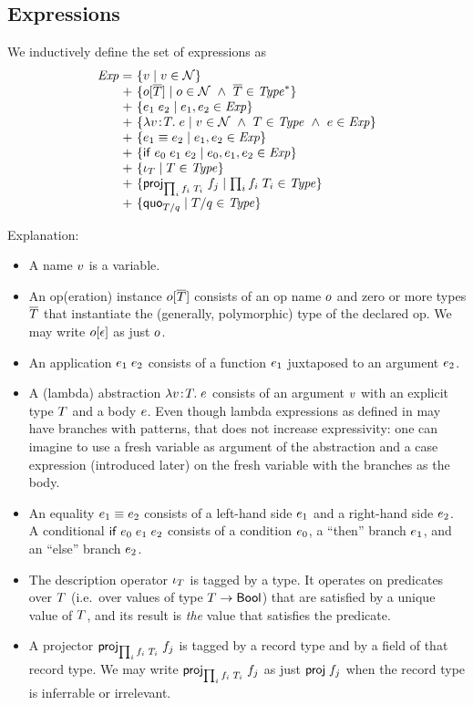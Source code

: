 \subsection{Expressions}

We inductively define the set of expressions as
\[
\setdefIXoI
 {\Expr}
 {+}
 {\setST{\var}{\var\in\Nam}}
 {\setST{\opO}{\onam\in\Nam\AND\typS\in\Seq{\Typ}}}
 {\setST{\appO}{\expr_1,\expr_2\in\Expr}}
 {\setST{\absO}{\var\in\Nam\AND\typ\in\Typ\AND\expr\in\Expr}}
 {\setST{\eqO}{\expr_1,\expr_2\in\Expr}}
 {\setST{\iifO}{\expr_0,\expr_1,\expr_2\in\Expr}}
 {\setST{\descopO}{\typ\in\Typ}}
\setdefIXoII
 {+}
 {\setST{\projopO}{\trecO\in\Typ}}
 {\setST{\quotO}{\tquotO\in\Typ}}
\]

Explanation:
\begin{itemize}
\item
A name $v$ is a variable.
\item
An op(eration) instance $o[\overline{T}]$ consists of an op name $o$ and zero or more
types $\overline{T}$ that instantiate the (generally, polymorphic) type of the
declared op. We may write $o[\epsilon]$ as just $o$.
\item
An application $e_1\;e_2$ consists of a function $e_1$ juxtaposed to an
argument $e_2$.
\item
A (lambda) abstraction $\lambda v\!:\!T.\;e$ consists of an argument $v$ with an explicit
type $T$ and a body $e$. Even though lambda expressions as defined in
\cite{lm} may have branches with patterns, that does not increase
expressivity: one can imagine to use a fresh variable as argument of the
abstraction and a case expression (introduced later) on the fresh variable
with the branches as the body.
\item
An equality $e_1\equiv e_2$ consists of a left-hand side $e_1$ and a right-hand
side $e_2$.
A conditional $\mathsf{if}\;e_0\;e_1\;e_2$ consists of a condition $e_0$, a ``then'' branch
$e_1$, and an ``else'' branch $e_2$.
\item
The description operator $\iota_{T}$ is tagged by a type. It operates on
predicates over $T$ (i.e.\ over values of type $T\to\mathsf{Bool}$) that
are satisfied by a unique value of $T$, and its result is \emph{the} value
that satisfies the predicate.
\item
A projector $\mathsf{proj}_{\prod_{i}f_i\;T_i}\;{f_j}$ is tagged by a record type and by a field of that
record type. We may write $\mathsf{proj}_{\prod_{i}f_i\;T_i}\;{f_j}$ as just $\mathsf{proj}\;{f_j}$ when the record type is
inferrable or irrelevant.

\end{itemize}
